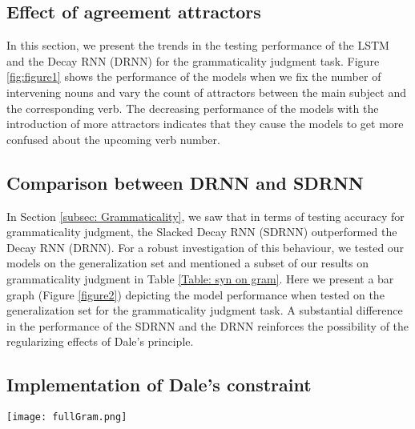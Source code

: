 \documentclass[11pt,a4paper]{article}
\begin{document}
\subsection{Effect of agreement attractors}
In this section, we present the trends in the testing performance of the LSTM and the Decay RNN (DRNN) for the grammaticality judgment task. Figure \ref{fig:figure1} shows the performance of the models when we fix the number of intervening nouns and vary the count of attractors between the main subject and the corresponding verb. The decreasing performance of the models with the introduction of more attractors indicates that they cause the models to get more confused about the upcoming verb number.










\subsection{Comparison between DRNN and SDRNN}
\label{subsec: app_gram}
In Section \ref{subsec: Grammaticality}, we saw that in terms of testing accuracy for grammaticality judgment, the Slacked Decay RNN (SDRNN) outperformed the Decay RNN (DRNN). For a robust investigation of this behaviour, we tested our models on the generalization set and mentioned a subset of our results on grammaticality judgment in Table \ref{Table: syn on gram}. Here we present a bar graph (Figure \ref{figure2}) depicting the model performance when tested on the generalization set for the grammaticality judgment task. A substantial difference in the performance of the SDRNN and the DRNN reinforces the possibility of the regularizing effects of Dale's principle.

\subsection{Implementation of Dale's constraint}
\label{subsec: dale imp}





\begin{figure*}
  \centering
  \texttt{[image: fullGram.png]}
  \caption{Trends in the performance of the LSTM (blue) and DRNN (orange) models with increasing numbers of intervening nouns. For each subplot corresponding to a fixed intervening noun number, the number of agreement attractors increases as we move from left to right on the -axis.}\label{fig:figure1}
\end{figure*}
\end{document}
